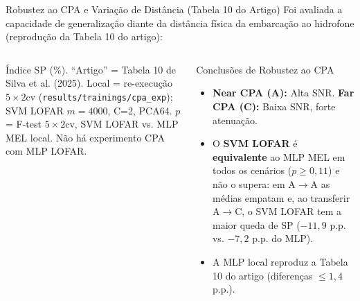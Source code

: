 \documentclass[aspectratio=169]{beamer}
\begin{document}
\begin{frame}{Robustez ao CPA e Varia\c{c}\~{a}o de Dist\^{a}ncia (Tabela 10 do Artigo)}
    \small
    Foi avaliada a capacidade de generaliza\c{c}\~{a}o diante da dist\^{a}ncia f\'{i}sica da embarca\c{c}\~{a}o ao hidrofone (reprodu\c{c}\~{a}o da Tabela 10 do artigo):
    
    \vspace{0.1cm}
    \begin{columns}
        \begin{table}[h]
        \centering
        \end{table}
        \vspace{-0.2cm}
        {\tiny \'{I}ndice SP (\%). ``Artigo'' = Tabela 10 de Silva et al. (2025). Local = re-execu\c{c}\~{a}o $5\times2$cv (\texttt{results/trainings/cpa\_exp}); SVM LOFAR $m=4000$, C=2, PCA64. $p$ = F-test $5\times2$cv, SVM LOFAR vs. MLP MEL local. N\~{a}o h\'{a} experimento CPA com MLP LOFAR.\par}

        \begin{block}{Conclus\~{o}es de Robustez ao CPA}
            \scriptsize
            \begin{itemize}
                \item \textbf{Near CPA (A):} Alta SNR. \textbf{Far CPA (C):} Baixa SNR, forte atenua\c{c}\~{a}o.
                \item O \textbf{SVM LOFAR} \'{e} \textbf{equivalente} ao MLP MEL em todos os cen\'{a}rios ($p \ge 0,11$) e n\~{a}o o supera: em A$\to$A as m\'{e}dias empatam e, ao transferir A$\to$C, o SVM LOFAR tem a maior queda de SP ($-11,9$ p.p. vs. $-7,2$ p.p. do MLP).
                \item A MLP local reproduz a Tabela 10 do artigo (diferen\c{c}as $\le 1,4$ p.p.).
            \end{itemize}
        \end{block}
    \end{columns}
\end{frame}
\end{document}
